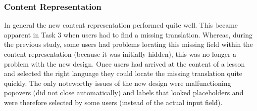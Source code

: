 \subsubsection{Content Representation}
In general the new content representation performed quite well. This became apparent in Task 3 when users had to find a missing translation. Whereas, during the previous study, some users had problems locating this missing field within the content representation (because it was initially hidden), this was no longer a problem with the new design. Once users had arrived at the content of a lesson and selected the right language they could locate the missing translation quite quickly. The only noteworthy issues of the new design were malfunctioning popovers (did not close automatically) and labels that looked placeholders and were therefore selected by some users (instead of the actual input field).







